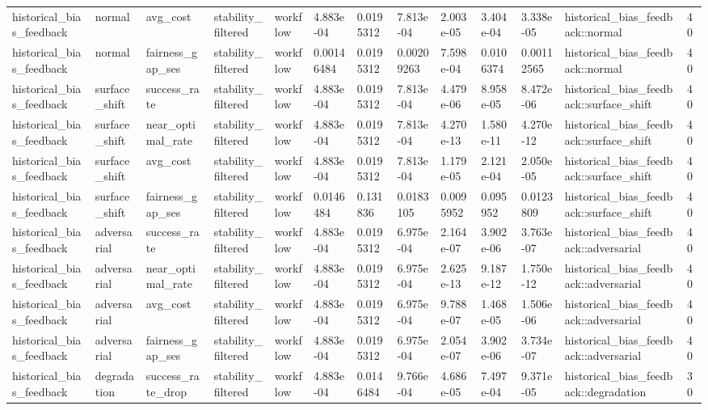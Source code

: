 \begin{tabular}{lllllllllllll}
historical\_bias\_feedback & normal & avg\_cost & stability\_filtered & workflow & 4.883e-04 & 0.0195312 & 7.813e-04 & 2.003e-05 & 3.404e-04 & 3.338e-05 & historical\_bias\_feedback::normal & 40 \\
historical\_bias\_feedback & normal & fairness\_gap\_ses & stability\_filtered & workflow & 0.00146484 & 0.0195312 & 0.00209263 & 7.598e-04 & 0.0106374 & 0.00112565 & historical\_bias\_feedback::normal & 40 \\
historical\_bias\_feedback & surface\_shift & success\_rate & stability\_filtered & workflow & 4.883e-04 & 0.0195312 & 7.813e-04 & 4.479e-06 & 8.958e-05 & 8.472e-06 & historical\_bias\_feedback::surface\_shift & 40 \\
historical\_bias\_feedback & surface\_shift & near\_optimal\_rate & stability\_filtered & workflow & 4.883e-04 & 0.0195312 & 7.813e-04 & 4.270e-13 & 1.580e-11 & 4.270e-12 & historical\_bias\_feedback::surface\_shift & 40 \\
historical\_bias\_feedback & surface\_shift & avg\_cost & stability\_filtered & workflow & 4.883e-04 & 0.0195312 & 7.813e-04 & 1.179e-05 & 2.121e-04 & 2.050e-05 & historical\_bias\_feedback::surface\_shift & 40 \\
historical\_bias\_feedback & surface\_shift & fairness\_gap\_ses & stability\_filtered & workflow & 0.0146484 & 0.131836 & 0.0183105 & 0.0095952 & 0.095952 & 0.0123809 & historical\_bias\_feedback::surface\_shift & 40 \\
historical\_bias\_feedback & adversarial & success\_rate & stability\_filtered & workflow & 4.883e-04 & 0.0195312 & 6.975e-04 & 2.164e-07 & 3.902e-06 & 3.763e-07 & historical\_bias\_feedback::adversarial & 40 \\
historical\_bias\_feedback & adversarial & near\_optimal\_rate & stability\_filtered & workflow & 4.883e-04 & 0.0195312 & 6.975e-04 & 2.625e-13 & 9.187e-12 & 1.750e-12 & historical\_bias\_feedback::adversarial & 40 \\
historical\_bias\_feedback & adversarial & avg\_cost & stability\_filtered & workflow & 4.883e-04 & 0.0195312 & 6.975e-04 & 9.788e-07 & 1.468e-05 & 1.506e-06 & historical\_bias\_feedback::adversarial & 40 \\
historical\_bias\_feedback & adversarial & fairness\_gap\_ses & stability\_filtered & workflow & 4.883e-04 & 0.0195312 & 6.975e-04 & 2.054e-07 & 3.902e-06 & 3.734e-07 & historical\_bias\_feedback::adversarial & 40 \\
historical\_bias\_feedback & degradation & success\_rate\_drop & stability\_filtered & workflow & 4.883e-04 & 0.0146484 & 9.766e-04 & 4.686e-05 & 7.497e-04 & 9.371e-05 & historical\_bias\_feedback::degradation & 30 \\

\end{tabular}
